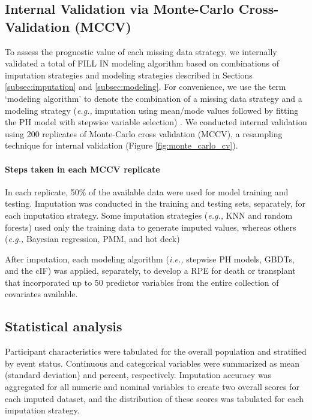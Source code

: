 \documentclass{article}
\begin{document}
\hypertarget{internal-validation-via-monte-carlo-cross-validation-mccv}{%
\subsection{Internal Validation via Monte-Carlo Cross-Validation
(MCCV)}\label{internal-validation-via-monte-carlo-cross-validation-mccv}}

\label{subsec:internal}

To assess the prognostic value of each missing data strategy, we
internally validated a total of FILL IN modeling algorithm based on
combinations of imputation strategies and modeling strategies described
in Sections \ref{subsec:imputation} and \ref{subsec:modeling}. For
convenience, we use the term `modeling algorithm' to denote the
combination of a missing data strategy and a modeling strategy
(\textit{e.g., }imputation using mean/mode values followed by fitting
the PH model with stepwise variable selection) \cite{kuhn2013applied}.
We conducted internal validation using 200 replicates of Monte-Carlo
cross validation (MCCV), a resampling technique for internal validation
(Figure \ref{fig:monte_carlo_cv}).

\paragraph{Steps taken in each MCCV replicate}

In each replicate, 50\% of the available data were used for model
training and testing. Imputation was conducted in the training and
testing sets, separately, for each imputation strategy. Some imputation
strategies (\textit{e.g., }KNN and random forests) used only the
training data to generate imputed values, whereas others
(\textit{e.g., }Bayesian regression, PMM, and hot deck)

After imputation, each modeling algorithm (\textit{i.e., }stepwise PH
models, GBDTs, and the cIF) was applied, separately, to develop a RPE
for death or transplant that incorporated up to 50 predictor variables
from the entire collection of covariates available.

\hypertarget{statistical-analysis}{%
\subsection{Statistical analysis}\label{statistical-analysis}}

Participant characteristics were tabulated for the overall population
and stratified by event status. Continuous and categorical variables
were summarized as mean (standard deviation) and percent, respectively.
Imputation accuracy was aggregated for all numeric and nominal variables
to create two overall scores for each imputed dataset, and the
distribution of these scores was tabulated for each imputation strategy.
\end{document}
